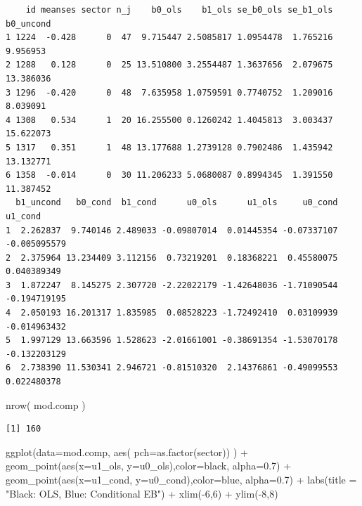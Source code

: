 \documentclass[
  letterpaper,
  DIV=11,
  numbers=noendperiod]{scrreprt}
\newenvironment{Shaded}{}{}
\newcommand{\AttributeTok}[1]{\textcolor[rgb]{0.49,0.56,0.16}{#1}}
\newcommand{\DecValTok}[1]{\textcolor[rgb]{0.25,0.63,0.44}{#1}}
\newcommand{\FloatTok}[1]{\textcolor[rgb]{0.25,0.63,0.44}{#1}}
\newcommand{\FunctionTok}[1]{\textcolor[rgb]{0.02,0.16,0.49}{#1}}
\newcommand{\NormalTok}[1]{#1}
\newcommand{\SpecialCharTok}[1]{\textcolor[rgb]{0.25,0.44,0.63}{#1}}
\newcommand{\StringTok}[1]{\textcolor[rgb]{0.25,0.44,0.63}{#1}}
\begin{document}
\begin{verbatim}
    id meanses sector n_j    b0_ols    b1_ols se_b0_ols se_b1_ols b0_uncond
1 1224  -0.428      0  47  9.715447 2.5085817 1.0954478  1.765216  9.956953
2 1288   0.128      0  25 13.510800 3.2554487 1.3637656  2.079675 13.386036
3 1296  -0.420      0  48  7.635958 1.0759591 0.7740752  1.209016  8.039091
4 1308   0.534      1  20 16.255500 0.1260242 1.4045813  3.003437 15.622073
5 1317   0.351      1  48 13.177688 1.2739128 0.7902486  1.435942 13.132771
6 1358  -0.014      0  30 11.206233 5.0680087 0.8994345  1.391550 11.387452
  b1_uncond   b0_cond  b1_cond      u0_ols      u1_ols     u0_cond      u1_cond
1  2.262837  9.740146 2.489033 -0.09807014  0.01445354 -0.07337107 -0.005095579
2  2.375964 13.234409 3.112156  0.73219201  0.18368221  0.45580075  0.040389349
3  1.872247  8.145275 2.307720 -2.22022179 -1.42648036 -1.71090544 -0.194719195
4  2.050193 16.201317 1.835985  0.08528223 -1.72492410  0.03109939 -0.014963432
5  1.997129 13.663596 1.528623 -2.01661001 -0.38691354 -1.53070178 -0.132203129
6  2.738390 11.530341 2.946721 -0.81510320  2.14376861 -0.49099553  0.022480378
\end{verbatim}

\begin{Shaded}
\begin{Highlighting}[]
\FunctionTok{nrow}\NormalTok{( mod.comp )}
\end{Highlighting}
\end{Shaded}

\begin{verbatim}
[1] 160
\end{verbatim}

\begin{Shaded}
\begin{Highlighting}[]
\FunctionTok{ggplot}\NormalTok{(}\AttributeTok{data=}\NormalTok{mod.comp, }\FunctionTok{aes}\NormalTok{( }\AttributeTok{pch=}\FunctionTok{as.factor}\NormalTok{(sector)) ) }\SpecialCharTok{+} 
         \FunctionTok{geom\_point}\NormalTok{(}\FunctionTok{aes}\NormalTok{(}\AttributeTok{x=}\NormalTok{u1\_ols, }\AttributeTok{y=}\NormalTok{u0\_ols),}\AttributeTok{color=}\StringTok{\textquotesingle{}black\textquotesingle{}}\NormalTok{, }\AttributeTok{alpha=}\FloatTok{0.7}\NormalTok{) }\SpecialCharTok{+}   
         \FunctionTok{geom\_point}\NormalTok{(}\FunctionTok{aes}\NormalTok{(}\AttributeTok{x=}\NormalTok{u1\_cond, }\AttributeTok{y=}\NormalTok{u0\_cond),}\AttributeTok{color=}\StringTok{\textquotesingle{}blue\textquotesingle{}}\NormalTok{, }\AttributeTok{alpha=}\FloatTok{0.7}\NormalTok{) }\SpecialCharTok{+} 
         \FunctionTok{labs}\NormalTok{(}\AttributeTok{title =} \StringTok{"Black: OLS, Blue: Conditional EB"}\NormalTok{) }\SpecialCharTok{+} 
         \FunctionTok{xlim}\NormalTok{(}\SpecialCharTok{{-}}\DecValTok{6}\NormalTok{,}\DecValTok{6}\NormalTok{) }\SpecialCharTok{+} \FunctionTok{ylim}\NormalTok{(}\SpecialCharTok{{-}}\DecValTok{8}\NormalTok{,}\DecValTok{8}\NormalTok{)}
\end{Highlighting}
\end{Shaded}
\end{document}
